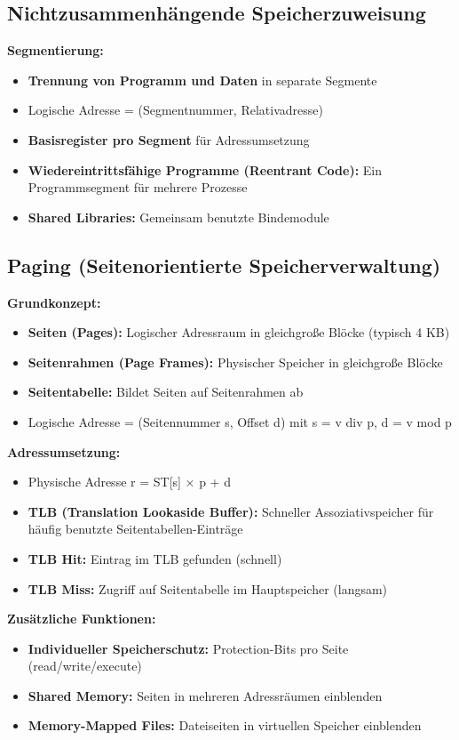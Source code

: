 \documentclass[9pt,a4paper]{extarticle}
\begin{document}
\begin{multicols*}{2}
\subsection{Nichtzusammenhängende Speicherzuweisung}
\textbf{Segmentierung:}
\begin{itemize}
\item \textbf{Trennung von Programm und Daten} in separate Segmente
\item Logische Adresse = (Segmentnummer, Relativadresse)
\item \textbf{Basisregister pro Segment} für Adressumsetzung
\item \textbf{Wiedereintrittsfähige Programme (Reentrant Code):} Ein Programmsegment für mehrere Prozesse
\item \textbf{Shared Libraries:} Gemeinsam benutzte Bindemodule
\end{itemize}

\subsection{Paging (Seitenorientierte Speicherverwaltung)}
\textbf{Grundkonzept:}
\begin{itemize}
\item \textbf{Seiten (Pages):} Logischer Adressraum in gleichgroße Blöcke (typisch 4 KB)
\item \textbf{Seitenrahmen (Page Frames):} Physischer Speicher in gleichgroße Blöcke
\item \textbf{Seitentabelle:} Bildet Seiten auf Seitenrahmen ab
\item Logische Adresse = (Seitennummer s, Offset d) mit s = v div p, d = v mod p
\end{itemize}

\textbf{Adressumsetzung:}
\begin{itemize}
\item Physische Adresse r = ST[s] × p + d
\item \textbf{TLB (Translation Lookaside Buffer):} Schneller Assoziativspeicher für häufig benutzte Seitentabellen-Einträge
\item \textbf{TLB Hit:} Eintrag im TLB gefunden (schnell)
\item \textbf{TLB Miss:} Zugriff auf Seitentabelle im Hauptspeicher (langsam)
\end{itemize}

\textbf{Zusätzliche Funktionen:}
\begin{itemize}
\item \textbf{Individueller Speicherschutz:} Protection-Bits pro Seite (read/write/execute)
\item \textbf{Shared Memory:} Seiten in mehreren Adressräumen einblenden
\item \textbf{Memory-Mapped Files:} Dateiseiten in virtuellen Speicher einblenden
\end{itemize}


\end{multicols*}
\end{document}
